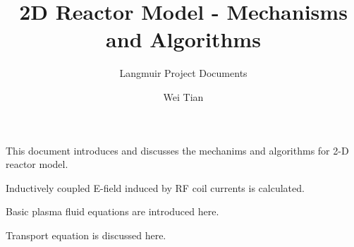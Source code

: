 \documentclass[oneside]{scrbook}
\title{2D Reactor Model - Mechanisms and Algorithms}
\author{Wei Tian}
\subtitle{Langmuir Project Documents}
\begin{document}
\maketitle

\tableofcontents

This document introduces and discusses the mechanims and algorithms for 2-D reactor model.

Inductively coupled E-field induced by RF coil currents is calculated.



Basic plasma fluid equations are introduced here.



Transport equation is discussed here.

\end{document}
